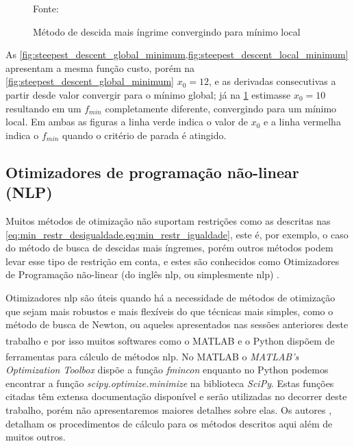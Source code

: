 \begin{figure}
\begin{minipage}{0.47\textwidth}
		\caption{Método de descida mais íngrime convergindo para mínimo local}  
		\label{fig:steepest_descent_local_minimum}		      
		Fonte: 
	\end{minipage}
\end{figure}

As \cref{fig:steepest_descent_global_minimum,fig:steepest_descent_local_minimum}
apresentam a mesma função custo, porém na \cref{fig:steepest_descent_global_minimum}
$x_0 = 12$, e as derivadas consecutivas a partir desde valor convergir para o
mínimo global; já na \cref{fig:steepest_descent_local_minimum} estimasse $x_0 = 10$
resultando em um $f_{min}$ completamente diferente, convergindo para um mínimo local.
Em ambas as figuras a linha verde indica o valor de $x_0$ e a linha vermelha indica
o $f_{min}$ quando o critério de parada é atingido.

\subsection{Otimizadores de programação não-linear (NLP)}
\label{subsec:otimizadores_nlp}

Muitos métodos de otimização não suportam restrições como as descritas nas
\cref{eq:min_restr_desigualdade,eq:min_restr_igualdade}, este é, por exemplo, o caso
do método de busca de descidas mais íngremes, porém outros métodos podem levar esse tipo
de restrição em conta, e estes são conhecidos como Otimizadores de Programação não-linear
(do inglês \acrlong{nlp}, ou simplesmente \acrshort{nlp}) \cite{Haugen2018}.

Otimizadores \acrshort{nlp} são úteis quando há a necessidade de métodos de otimização
que sejam mais robustos e mais flexíveis do que técnicas mais simples, como o método
de busca de Newton, ou aqueles apresentados nas sessões anteriores deste trabalho e por
isso muitos softwares como o MATLAB\textsuperscript{\tiny\textregistered} e o Python
dispõem de ferramentas para cálculo de métodos \acrshort{nlp}. No
MATLAB\textsuperscript{\tiny\textregistered} o \textit{MATLAB's Optimization Toolbox}
dispõe a função \textit{fmincon} enquanto no Python podemos encontrar a função
\textit{scipy.optimize.minimize} na biblioteca \textit{SciPy}. Estas funções citadas
têm extensa documentação disponível e serão utilizadas no decorrer deste trabalho, porém
não apresentaremos maiores detalhes sobre elas. Os autores ,
 detalham os procedimentos de cálculo para os métodos descritos
aqui além de muitos outros.

